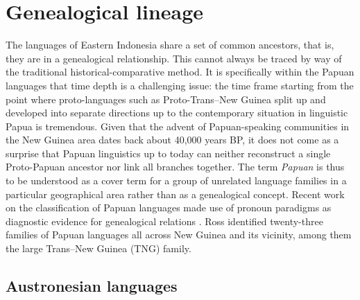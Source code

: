\section{Genealogical lineage}\label{sec:geneticlineage}

The languages of Eastern Indonesia share a set of common ancestors, that is, they are in a genealogical relationship. This cannot always be traced by way of the traditional historical-comparative method. It is specifically within the Papuan languages that time depth is a challenging issue: the time frame starting from the point where proto-languages such as Proto-Trans--New Guinea split up and developed into separate directions up to the contemporary situation in linguistic Papua is tremendous. Given that the advent of Papuan-speaking communities in the New Guinea area dates back about 40,000 years BP, it does not come as a surprise that Papuan linguistics up to today can neither reconstruct a single Proto-Papuan ancestor nor link all branches together. The term \textit{Papuan} is thus to be understood as a cover term for a group of unrelated language families in a particular geographical area rather than as a genealogical concept. Recent work on the classification of Papuan languages made use of pronoun paradigms as diagnostic evidence for genealogical relations \citep{Ross2005}. Ross identified twenty-three families of Papuan languages all across New Guinea and its vicinity, among them the large Trans--New Guinea (TNG) family.

\subsection{Austronesian languages}

